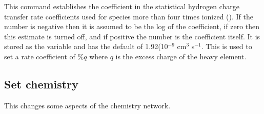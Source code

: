 This command establishes the coefficient in the statistical hydrogen
charge transfer rate coefficients used for species more than four times
ionized (\citealp{Ferland1997}).
If the number is negative then it is assumed
to be the log of the coefficient,
if zero then this estimate is turned off,
and if positive the number is the coefficient itself.
It is stored as the
variable  and has the default of
1.92(10$^{-9}$ cm$^3$ s$^{-1}$.
This is used to
set a rate coefficient of  \%$q$
where $q$ is the excess charge of the heavy element.

\subsection{Set chemistry}

This changes some aspects of the chemistry network.
